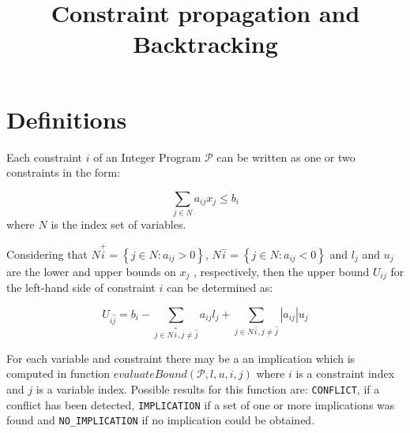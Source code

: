 \documentclass{article}
\begin{document}
\title{Constraint propagation and Backtracking}

\maketitle

\section{Definitions}

Each constraint $i$ of an Integer Program $\mathcal{P}$ can be written as one or two constraints in the form:

$$
\sum_{j\in N}a_{ij}x_j\leq b_i
$$
where $N$ is the index set of variables.

Considering that $N\stackrel{+}{i}=\left\{j\in N:a_{ij}>0\right\}$, $N\stackrel{-}{i}=\left\{j\in N:a_{ij}<0\right\}$ and $l_j$ and $u_j$ are the lower and upper bounds on $x_j$ , respectively, then the upper bound $U_{ij}$ for the left-hand side of constraint $i$ can be determined as:

$$
U_{i\hat{j}} = b_i - \sum_{j\in N\stackrel{+}{i}, j\neq \hat{j}}a_{ij}l_j + \sum_{j\in N\stackrel{-}{i}, j\neq \hat{j}}\left|a_{ij}\right|u_j 
$$

For each variable and constraint there may be a an implication which is computed in function $evaluateBound( \mathcal{P},l,u,i,j )$ where $i$ is a constraint index and $j$ is a variable index. Possible results for this function are: \texttt{CONFLICT}, if a conflict has been detected, \texttt{IMPLICATION} if a set of one or more implications was found and \texttt{NO\_IMPLICATION} if no implication could be obtained.
\end{document}
